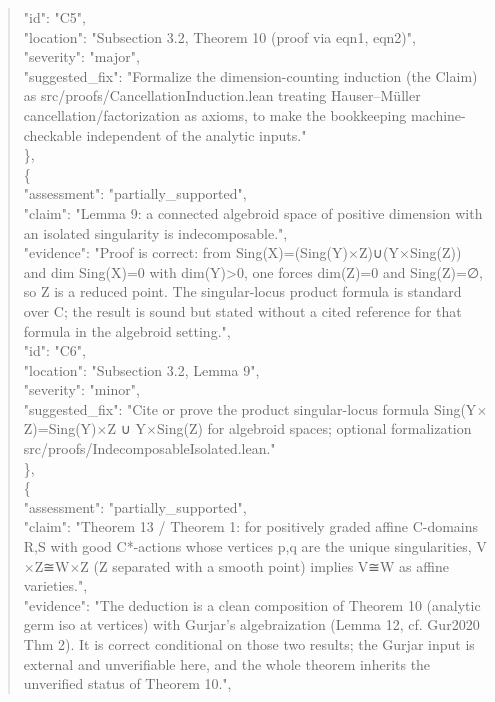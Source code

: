 \documentclass[11pt]{article}
\begin{document}
\begin{quote}
      "id": "C5",\\
      "location": "Subsection 3.2, Theorem 10 (proof via eqn1, eqn2)",\\
      "severity": "major",\\
      "suggested\_fix": "Formalize the dimension-counting induction (the Claim) as src/proofs/CancellationInduction.lean treating Hauser--Müller cancellation/factorization as axioms, to make the bookkeeping machine-checkable independent of the analytic inputs."\\
    \},\\
    \{\\
      "assessment": "partially\_supported",\\
      "claim": "Lemma 9: a connected algebroid space of positive dimension with an isolated singularity is indecomposable.",\\
      "evidence": "Proof is correct: from Sing(X)=(Sing(Y)\ensuremath{\times}Z)∪(Y\ensuremath{\times}Sing(Z)) and dim Sing(X)=0 with dim(Y)>0, one forces dim(Z)=0 and Sing(Z)=∅, so Z is a reduced point. The singular-locus product formula is standard over C; the result is sound but stated without a cited reference for that formula in the algebroid setting.",\\
      "id": "C6",\\
      "location": "Subsection 3.2, Lemma 9",\\
      "severity": "minor",\\
      "suggested\_fix": "Cite or prove the product singular-locus formula Sing(Y\ensuremath{\times}Z)=Sing(Y)\ensuremath{\times}Z ∪ Y\ensuremath{\times}Sing(Z) for algebroid spaces; optional formalization src/proofs/IndecomposableIsolated.lean."\\
    \},\\
    \{\\
      "assessment": "partially\_supported",\\
      "claim": "Theorem 13 / Theorem 1: for positively graded affine C-domains R,S with good C*-actions whose vertices p,q are the unique singularities, V\ensuremath{\times}Z≅W\ensuremath{\times}Z (Z separated with a smooth point) implies V≅W as affine varieties.",\\
      "evidence": "The deduction is a clean composition of Theorem 10 (analytic germ iso at vertices) with Gurjar's algebraization (Lemma 12, cf. Gur2020 Thm 2). It is correct conditional on those two results; the Gurjar input is external and unverifiable here, and the whole theorem inherits the unverified status of Theorem 10.",\\

\end{quote}
\end{document}
